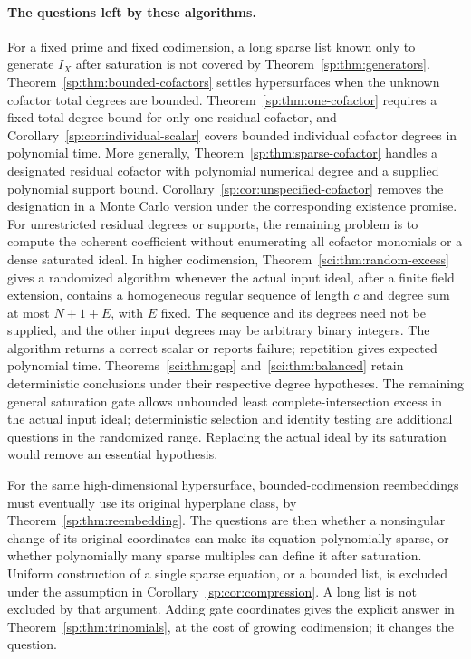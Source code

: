 \paragraph{The questions left by these algorithms.}
For a fixed prime and fixed codimension, a long sparse list known only
to generate $I_X$ after saturation is not covered by
Theorem~\ref{sp:thm:generators}. Theorem~\ref{sp:thm:bounded-cofactors}
settles hypersurfaces when the unknown cofactor total degrees are bounded.
Theorem~\ref{sp:thm:one-cofactor} requires a fixed total-degree bound
for only one residual cofactor, and
Corollary~\ref{sp:cor:individual-scalar} covers bounded individual
cofactor degrees in polynomial time. More generally,
Theorem~\ref{sp:thm:sparse-cofactor} handles a designated residual
cofactor with polynomial numerical degree and a supplied polynomial
support bound. Corollary~\ref{sp:cor:unspecified-cofactor} removes
the designation in a Monte Carlo version under the corresponding
existence promise. For unrestricted residual degrees or supports,
the remaining problem is to compute the
coherent coefficient without enumerating all cofactor monomials or
a dense saturated ideal. In higher codimension,
Theorem~\ref{sci:thm:random-excess} gives a randomized algorithm
whenever the actual input ideal, after a finite field extension,
contains a homogeneous regular sequence of length $c$ and degree sum
at most $N+1+E$, with $E$ fixed. The sequence and its degrees need not
be supplied, and the other input degrees may be arbitrary binary
integers. The algorithm returns a correct scalar or reports failure;
repetition gives expected polynomial time. Theorems~\ref{sci:thm:gap}
and~\ref{sci:thm:balanced} retain deterministic conclusions under
their respective degree hypotheses. The remaining general saturation
gate allows unbounded least complete-intersection excess in the
actual input ideal; deterministic selection and identity testing are
additional questions in the randomized range. Replacing the actual
ideal by its saturation would remove an essential hypothesis.

For the same high-dimensional hypersurface, bounded-codimension
reembeddings must eventually use its original hyperplane class, by
Theorem~\ref{sp:thm:reembedding}. The questions are then whether a
nonsingular change of its original coordinates can make its equation
polynomially sparse, or whether polynomially many sparse multiples
can define it after saturation. Uniform construction of a single
sparse equation, or a bounded list, is excluded under the assumption
in Corollary~\ref{sp:cor:compression}. A long list is not excluded by
that argument. Adding gate coordinates gives the explicit answer in
Theorem~\ref{sp:thm:trinomials}, at the cost of growing codimension;
it changes the question.

